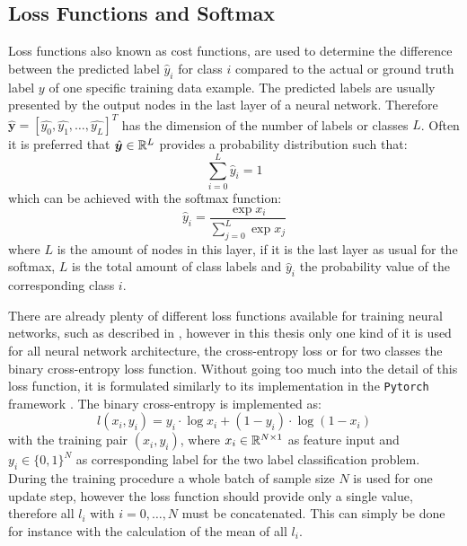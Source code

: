 
\subsection{Loss Functions and Softmax}
Loss functions also known as cost functions, are used to determine the difference between the predicted label $\hat{y}_i$ for class $i$ compared to the actual or ground truth label $y$ of one specific training data example.
The predicted labels are usually presented by the output nodes in the last layer of a neural network.
Therefore $\hat{\bm{y}} = [\hat{y_0}, \hat{y_1}, \dots, \hat{y_L}]^T$ has the dimension of the number of labels or classes $L$.
Often it is preferred that $\hat{\bm{y}} \in \mathbb{R}^L$ provides a probability distribution such that:
\begin{equation}
  \sum_{i=0}^L \hat{y}_i = 1
\end{equation}
which can be achieved with the softmax function:
\begin{equation}\label{eq:nn_theory_softmax}
  \hat{y}_i = \frac{\exp{x_i}}{\sum_{j=0}^{L}\exp{x_j}}
\end{equation}
where $L$ is the amount of nodes in this layer, if it is the last layer as usual for the softmax, $L$ is the total amount of class labels and $\hat{y}_i$ the probability value of the corresponding class $i$.

There are already plenty of different loss functions available for training neural networks, such as described in \cite{LeCun2006}, however in this thesis only one kind of it is used for all neural network architecture, the cross-entropy loss or for two classes the binary cross-entropy loss function.
Without going too much into the detail of this loss function, it is formulated similarly to its implementation in the \texttt{Pytorch} framework \cite{Pytorch}.
The binary cross-entropy is implemented as:
\begin{equation}\label{eq:nn_theory_binary_cross_entropy}
  l(x_i, y_i) = y_i \cdot \log x_i + (1 - y_i) \cdot \log (1 - x_i)
\end{equation}
with the training pair $(x_i, y_i)$, where $x_i \in \mathbb{R}^{N \times 1}$ as feature input and $y_i \in \{0, 1\}^N$ as corresponding label for the two label classification problem.
During the training procedure a whole batch of sample size $N$ is used for one update step, however the loss function should provide only a single value, therefore all $l_i$ with $i = 0, \dots, N$ must be concatenated.
This can simply be done for instance with the calculation of the mean of all $l_i$.

